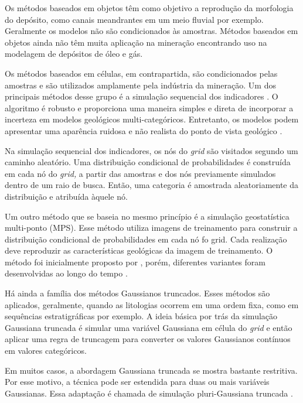 Os métodos baseados em objetos \cite{pyrcz2014geostatistical} têm como objetivo a reprodução da morfologia do depósito, como canais meandrantes em um meio fluvial por exemplo. Geralmente os modelos não são condicionados às amostras. Métodos baseados em objetos ainda não têm muita aplicação na mineração encontrando uso na modelagem de depósitos de óleo e gás.

Os métodos baseados em células, em contrapartida, são condicionados pelas amostras e são utilizados amplamente pela indústria da mineração. Um dos principais métodos desse grupo é a simulação sequencial dos indicadores \cite{alabert1987stochastic}. O algoritmo é robusto e proporciona uma maneira simples e direta de incorporar a incerteza em modelos geológicos multi-categóricos. Entretanto, os modelos podem apresentar uma aparência ruidosa e não realista do ponto de vista geológico \cite{deutsch2006sequential}.

Na simulação sequencial dos indicadores, os nós do \textit{grid} são visitados segundo um caminho aleatório. Uma distribuição condicional de probabilidades é construída em cada nó do \textit{grid,} a partir das amostras e dos nós previamente simulados dentro de um raio de busca. Então, uma categoria é amostrada aleatoriamente da distribuição e atribuída àquele nó.  

Um outro método que se baseia no mesmo princípio é a simulação geostatística multi-ponto (MPS). Esse método utiliza imagens de treinamento para construir a distribuição condicional de probabilidades em cada nó fo grid. Cada realização deve reproduzir as características geológicas da imagem de treinamento. O método foi inicialmente proposto por , porém, diferentes variantes foram desenvolvidas ao longo do tempo \cite{strebelle, boucher2009considering}.

Há ainda a família dos métodos Gaussianos truncados. Esses métodos são aplicados, geralmente, quando as litologias ocorrem em uma ordem fixa, como em sequências estratigráficas por exemplo. A ideia básica por trás da simulação Gaussiana truncada \cite{matheron1987conditional} é simular uma variável Gaussiana em célula do \textit{grid} e então aplicar uma regra de truncagem para converter os valores Gaussianos contínuos em valores categóricos.

Em muitos casos, a abordagem Gaussiana truncada se mostra bastante restritiva. Por esse motivo, a técnica pode ser estendida para duas ou mais variáveis Gaussianas. Essa adaptação é chamada de simulação pluri-Gaussiana truncada \cite{armstrong2011plurigaussian}.


